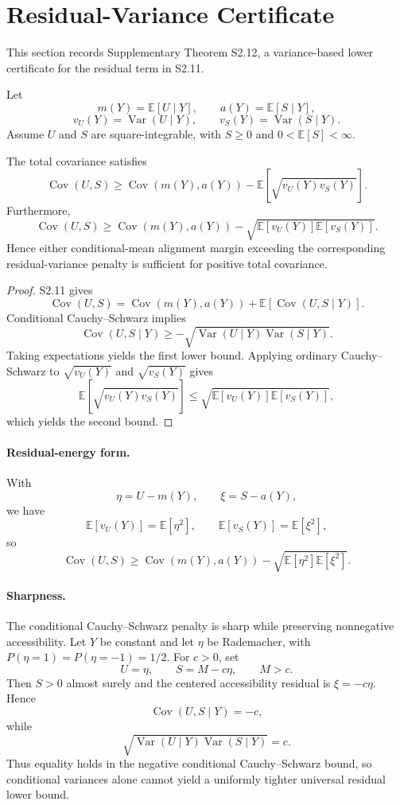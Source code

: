 \section{Residual-Variance Certificate}

This section records Supplementary Theorem S2.12, a variance-based lower certificate for the residual term in S2.11.

Let
\[
m(Y)=\mathbb E[U\mid Y],
\qquad
a(Y)=\mathbb E[S\mid Y],
\]
\[
v_U(Y)=\operatorname{Var}(U\mid Y),
\qquad
v_S(Y)=\operatorname{Var}(S\mid Y).
\]
Assume $U$ and $S$ are square-integrable, with $S\ge0$ and $0<\mathbb E[S]<\infty$.

\begin{theorem}
The total covariance satisfies
\[
\operatorname{Cov}(U,S)
\ge
\operatorname{Cov}(m(Y),a(Y))
-
\mathbb E\!\left[
\sqrt{v_U(Y)v_S(Y)}
\right].
\]
Furthermore,
\[
\operatorname{Cov}(U,S)
\ge
\operatorname{Cov}(m(Y),a(Y))
-
\sqrt{
\mathbb E[v_U(Y)]
\mathbb E[v_S(Y)]
}.
\]
Hence either conditional-mean alignment margin exceeding the corresponding residual-variance penalty is sufficient for positive total covariance.
\end{theorem}

\begin{proof}
S2.11 gives
\[
\operatorname{Cov}(U,S)
=
\operatorname{Cov}(m(Y),a(Y))
+
\mathbb E[\operatorname{Cov}(U,S\mid Y)].
\]
Conditional Cauchy--Schwarz implies
\[
\operatorname{Cov}(U,S\mid Y)
\ge
-
\sqrt{
\operatorname{Var}(U\mid Y)
\operatorname{Var}(S\mid Y)
}.
\]
Taking expectations yields the first lower bound. Applying ordinary Cauchy--Schwarz to $\sqrt{v_U(Y)}$ and $\sqrt{v_S(Y)}$ gives
\[
\mathbb E[\sqrt{v_U(Y)v_S(Y)}]
\le
\sqrt{\mathbb E[v_U(Y)]\mathbb E[v_S(Y)]},
\]
which yields the second bound.
\end{proof}

\paragraph{Residual-energy form.}
With
\[
\eta=U-m(Y),
\qquad
\xi=S-a(Y),
\]
we have
\[
\mathbb E[v_U(Y)]=\mathbb E[\eta^2],
\qquad
\mathbb E[v_S(Y)]=\mathbb E[\xi^2],
\]
so
\[
\operatorname{Cov}(U,S)
\ge
\operatorname{Cov}(m(Y),a(Y))
-
\sqrt{\mathbb E[\eta^2]\mathbb E[\xi^2]}.
\]

\paragraph{Sharpness.}
The conditional Cauchy--Schwarz penalty is sharp while preserving nonnegative accessibility. Let $Y$ be constant and let $\eta$ be Rademacher, with $P(\eta=1)=P(\eta=-1)=1/2$. For $c>0$, set
\[
U=\eta,
\qquad
S=M-c\eta,
\qquad
M>c.
\]
Then $S>0$ almost surely and the centered accessibility residual is $\xi=-c\eta$. Hence
\[
\operatorname{Cov}(U,S\mid Y)=-c,
\]
while
\[
\sqrt{\operatorname{Var}(U\mid Y)\operatorname{Var}(S\mid Y)}=c.
\]
Thus equality holds in the negative conditional Cauchy--Schwarz bound, so conditional variances alone cannot yield a uniformly tighter universal residual lower bound.
